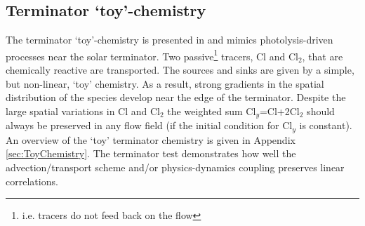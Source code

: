\documentclass[times,doublespace]{fldauth}
\begin{document}
\subsection{Terminator `toy'-chemistry}
The terminator `toy'-chemistry is presented in \cite{LCLVT2015GMD} and mimics photolysis-driven processes near the solar terminator. Two passive{\footnote{i.e. tracers do not feed back on the flow}} tracers, Cl and Cl$_2$, that are chemically reactive are transported. The sources and sinks are given by a simple, but non-linear, `toy' chemistry. As a result, strong gradients in the spatial distribution of the species develop near the edge of the terminator. Despite the large spatial variations in Cl and Cl$_2$ the weighted sum Cl$_y$=Cl+2Cl$_2$ should always be preserved in any flow field (if the initial condition for Cl$_y$ is constant). An overview of the `toy' terminator chemistry is given in Appendix \ref{sec:ToyChemistry}. The terminator test demonstrates how well the advection/transport scheme and/or physics-dynamics coupling preserves linear correlations.
\end{document}
